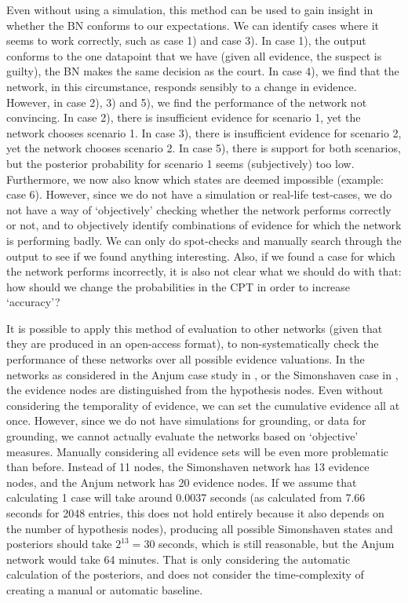 \documentclass[12pt]{article}
\begin{document}
Even without using a simulation, this method can be used to gain insight in whether the BN conforms to our expectations. We can identify cases where it seems to work correctly, such as case 1) and case 3). In case 1), the output conforms to the one datapoint that we have (given all evidence, the suspect is guilty), the BN makes the same decision as the court. In case 4), we find that the network, in this circumstance, responds sensibly to a change in evidence. However, in case 2), 3) and 5), we find the performance of the network not convincing. In case 2), there is insufficient evidence for scenario 1, yet the network chooses scenario 1. In case 3), there is insufficient evidence for scenario 2, yet the network chooses scenario 2. In case 5), there is support for both scenarios, but the posterior probability for scenario 1 seems (subjectively) too low. Furthermore, we now also know which states are deemed impossible (example: case 6). However, since we do not have a simulation or real-life test-cases, we do not have a way of `objectively' checking whether the network performs correctly or not, and to objectively identify combinations of evidence for which the network is performing badly. We can only do spot-checks and manually search through the output to see if we found anything interesting. Also, if we found a case for which the network performs incorrectly, it is also not clear what we should do with that: how should we change the probabilities in the CPT in order to increase `accuracy'?

It is possible to apply this method of evaluation to other networks (given that they are produced in an open-access format), to non-systematically check the performance of these networks over all possible evidence valuations. In the networks as considered in the Anjum case study in \citet{vlek2016}, or the Simonshaven case in \citet{Fenton2019}, the evidence nodes are distinguished from the hypothesis nodes. Even without considering the temporality of evidence, we can set the cumulative evidence all at once. However, since we do not have simulations for grounding, or data for grounding, we cannot actually evaluate the networks based on `objective' measures. Manually considering all evidence sets will be even more problematic than before. Instead of 11 nodes, the Simonshaven network has 13 evidence nodes, and the Anjum network has 20 evidence nodes. If we assume that calculating 1 case will take around 0.0037 seconds (as calculated from 7.66 seconds for 2048 entries, this does not hold entirely because it also depends on the number of hypothesis nodes), producing all possible Simonshaven states and posteriors should take $2^{13} = 30$ seconds, which is still reasonable, but the Anjum network would take 64 minutes. That is only considering the automatic calculation of the posteriors, and does not consider the time-complexity of creating a manual or automatic baseline. 
\end{document}
